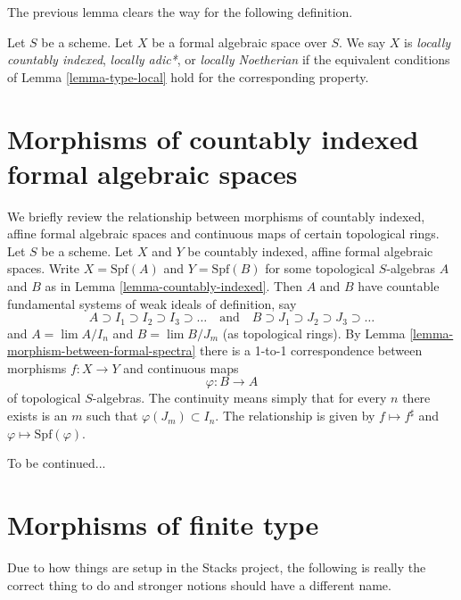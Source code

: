 \noindent
The previous lemma clears the way for the following definition.

\begin{definition}
\label{definition-types-formal-algebraic-spaces}
Let $S$ be a scheme. Let $X$ be a formal algebraic space over $S$.
We say $X$ is {\it locally countably indexed},
{\it locally adic*}, or {\it locally Noetherian}
if the equivalent conditions of Lemma \ref{lemma-type-local}
hold for the corresponding property.
\end{definition}






\section{Morphisms of countably indexed formal algebraic spaces}
\label{section-morphisms-rings}

\noindent
We briefly review the relationship between morphisms of
countably indexed, affine formal algebraic spaces and
continuous maps of certain topological rings.
Let $S$ be a scheme. Let $X$ and $Y$ be countably indexed,
affine formal algebraic spaces. Write $X = \text{Spf}(A)$
and $Y = \text{Spf}(B)$ for some topological $S$-algebras $A$ and $B$
as in Lemma \ref{lemma-countably-indexed}.
Then $A$ and $B$ have countable fundamental systems
of weak ideals of definition, say
$$
A \supset I_1 \supset I_2 \supset I_3 \supset \ldots
\quad\text{and}\quad
B \supset J_1 \supset J_2 \supset J_3 \supset \ldots
$$
and $A = \lim A/I_n$ and $B = \lim B/J_m$ (as topological rings).
By Lemma \ref{lemma-morphism-between-formal-spectra}
there is a 1-to-1 correspondence between morphisms
$f : X \to Y$ and continuous maps
$$
\varphi : B \longrightarrow A
$$
of topological $S$-algebras. The continuity means simply that
for every $n$ there exists is an $m$ such that $\varphi(J_m) \subset I_n$.
The relationship is given by $f \mapsto f^\sharp$ and
$\varphi \mapsto \text{Spf}(\varphi)$.

\medskip\noindent
To be continued...




\section{Morphisms of finite type}
\label{section-finite-type}

\noindent
Due to how things are setup in the Stacks project, the following
is really the correct thing to do and stronger notions should have
a different name.

